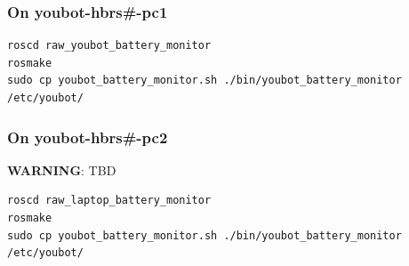 \documentclass[a4paper,12pt]{article}
\begin{document}
\subsubsection{On youbot-hbrs\#-pc1}
\begin{lstlisting}
roscd raw_youbot_battery_monitor
rosmake
sudo cp youbot_battery_monitor.sh ./bin/youbot_battery_monitor /etc/youbot/
\end{lstlisting}


\subsubsection{On youbot-hbrs\#-pc2}
\textbf{WARNING}: TBD
\begin{lstlisting}
roscd raw_laptop_battery_monitor
rosmake
sudo cp youbot_battery_monitor.sh ./bin/youbot_battery_monitor /etc/youbot/
\end{lstlisting}
\end{document}
